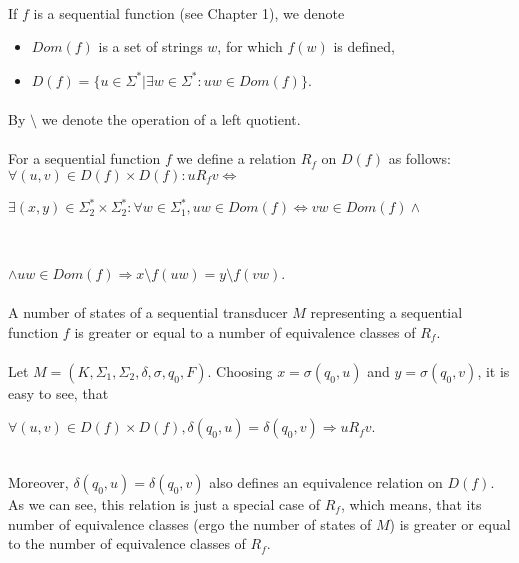 \paragraph{}
\oznacenie If $f$ is a sequential function (see Chapter 1), we denote
\begin{itemize}
\item $Dom(f)$ is a set of strings $w$, for which $f(w)$ is defined,
\item $D(f) = \{ u \in \Sigma ^{*} | \exists w \in \Sigma ^{*}: uw \in Dom(f) \} $.
\end{itemize}

\paragraph{}
\oznacenie By $\setminus $ we denote the operation of a left quotient.

\paragraph{}
 For a sequential function $f$  we define a relation $R_{f}$ on $D(f)$ as follows:\\
$\forall (u, v) \in D(f) \times D(f): u R_{f} v \iff$ \\
\centerline{$\exists (x, y) \in \Sigma_{2}^* \times \Sigma_{2}^*: \forall w \in \Sigma_{1}^{*}, uw \in Dom(f) \Leftrightarrow vw \in Dom(f) \wedge $}\\
\centerline{$\wedge uw \in Dom(f) \Rightarrow x\setminus f(uw) = y\setminus f(vw)$.}

\paragraph{}
\cveta A number of states of a sequential transducer $M$ representing a sequential function $f$ is greater or equal to a number of equivalence classes of $R_{f}$.

\paragraph{}
\dokaz Let $M=(K, \Sigma_{1}, \Sigma_{2}, \delta, \sigma, q_{0}, F)$. Choosing $x = \sigma (q_{0}, u)$ and $y = \sigma (q_{0}, v)$, it is easy to see, that\\
\centerline{$\forall (u,v) \in D(f) \times D(f), \delta (q_{0}, u) = \delta (q_{0}, v) \Rightarrow u R_{f} v$.}\\
Moreover, $\delta (q_{0}, u) = \delta (q_{0}, v)$ also defines an equivalence relation on $D(f)$. As we can see, this relation is just a special case of $R_{f}$, which means, that its number of equivalence classes (ergo the number of states of $M$) is greater or equal to the number of equivalence classes of $R_{f}$. \square

